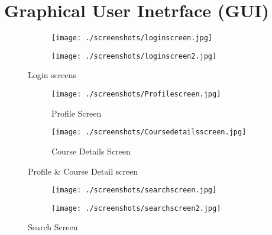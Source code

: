 \section{Graphical User Inetrface (GUI)}

\begin{figure}[!h]
    \centering
    \begin{subfigure}{.5\textwidth}
      \centering
      \texttt{[image: ./screenshots/loginscreen.jpg]}
      \label{fig:sub1}
    \end{subfigure}%
    \begin{subfigure}{.5\textwidth}
      \centering
      \texttt{[image: ./screenshots/loginscreen2.jpg]}
      \label{fig:sub2}
    \end{subfigure}
    \caption{Login screens}
    \label{fig:test}
    \end{figure}

    \begin{figure}
        \centering
        \begin{subfigure}{.5\textwidth}
          \centering
          \texttt{[image: ./screenshots/Profilescreen.jpg]}
          \caption{Profile Screen}
          \label{fig:sub1}
        \end{subfigure}%
        \begin{subfigure}{.5\textwidth}
          \centering
          \texttt{[image: ./screenshots/Coursedetailsscreen.jpg]}
          \caption{Course Details Screen}
          \label{fig:sub2}
        \end{subfigure}
        \caption{Profile \& Course Detail screen}
        \label{fig:test}
        \end{figure}

    \begin{figure}
        \centering
        \begin{subfigure}{.5\textwidth}
          \centering
          \texttt{[image: ./screenshots/searchscreen.jpg]}
          \label{fig:sub1}
        \end{subfigure}%
        \begin{subfigure}{.5\textwidth}
          \centering
          \texttt{[image: ./screenshots/searchscreen2.jpg]}
          \label{fig:sub2}
        \end{subfigure}
        \caption{Search Screen}
        \label{fig:test}
        \end{figure}